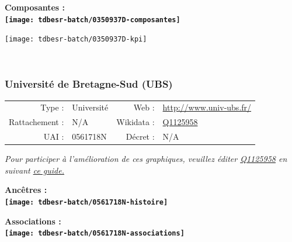\documentclass[12pt,french,]{article}
\begin{document}
\hrulefill

\begin{center} \bf Composantes : \\  
\texttt{[image: tdbesr-batch/0350937D-composantes]} \end{center}

\begin{center}\texttt{[image: tdbesr-batch/0350937D-kpi]} \end{center}\checkoddpage

\ifoddpage ~\newpage \fi   

\hypertarget{universituxe9-de-bretagne-sud-ubs}{%
\subsubsection{Université de Bretagne-Sud
(UBS)}\label{universituxe9-de-bretagne-sud-ubs}}

\begin{tabular*}{\textwidth}{rp{5cm}rl}  
\hline  
Type : & Université & Web : &\href{http://www.univ-ubs.fr/}{http://www.univ-ubs.fr/} \\  
Rattachement : & N/A & Wikidata : & \href{https://www.wikidata.org/entity/Q1125958}{Q1125958} \\  
UAI : & 0561718N & Décret : & N/A \\  
\hline  
\end{tabular*}

\textit{\scriptsize Pour participer à l'amélioration de ces graphiques, veuillez éditer  \href{https://www.wikidata.org/entity/Q1125958}{Q1125958}  en suivant \href{https://github.com/cpesr/wikidataESR/blob/master/Rmd/wikidataESR.md}{ce guide.}}

\vspace{1cm}  
\begin{minipage}[b]{0.50\textwidth}\begin{center} \bf Ancêtres : \\  
\texttt{[image: tdbesr-batch/0561718N-histoire]} \end{center}\end{minipage}\begin{minipage}[b]{0.50\textwidth}\begin{center} \bf Associations : \\  
\texttt{[image: tdbesr-batch/0561718N-associations]} \end{center}\end{minipage}

\hrulefill
\end{document}
